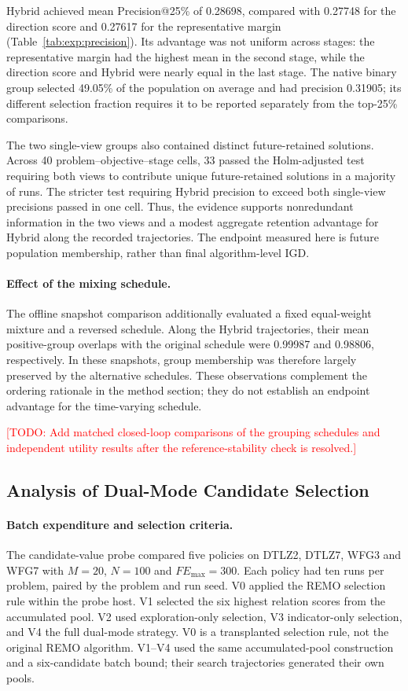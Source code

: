 \documentclass[final,5p,times,twocolumn]{elsarticle}
\newcommand{\TODO}[1]{\textcolor{red}{[TODO: #1]}}
\begin{document}
Hybrid achieved mean Precision@25\% of 0.28698, compared with 0.27748
for the direction score and 0.27617 for the representative margin
(Table~\ref{tab:exp:precision}). Its advantage was not uniform across
stages: the representative margin had the highest mean in the second
stage, while the direction score and Hybrid were nearly equal in the
last stage. The native binary group selected 49.05\% of the population
on average and had precision 0.31905; its different selection fraction
requires it to be reported separately from the top-25\% comparisons.

The two single-view groups also contained distinct future-retained
solutions. Across 40 problem--objective--stage cells, 33 passed the
Holm-adjusted test requiring both views to contribute unique
future-retained solutions in a majority of runs. The stricter test
requiring Hybrid precision to exceed both single-view precisions passed
in one cell. Thus, the evidence supports nonredundant information in the
two views and a modest aggregate retention advantage for Hybrid along
the recorded trajectories. The endpoint measured here is future
population membership, rather than final algorithm-level IGD.

\paragraph{Effect of the mixing schedule.}
The offline snapshot comparison additionally evaluated a fixed
equal-weight mixture and a reversed schedule. Along the Hybrid
trajectories, their mean positive-group overlaps with the original
schedule were 0.99987 and 0.98806, respectively. In these snapshots,
group membership was therefore largely preserved by the alternative
schedules. These observations complement the ordering rationale in the
method section; they do not establish an endpoint advantage for the
time-varying schedule.

\TODO{Add matched closed-loop comparisons of the grouping schedules and
independent utility results after the reference-stability check is resolved.}

\subsection{Analysis of Dual-Mode Candidate Selection}
\label{sec:exp:candidate}

\paragraph{Batch expenditure and selection criteria.}
The candidate-value probe compared five policies on DTLZ2, DTLZ7, WFG3
and WFG7 with $M=20$, $N=100$ and $FE_{\max}=300$. Each policy had ten
runs per problem, paired by the problem and run seed. V0 applied the
REMO selection rule within the probe host. V1 selected the six highest
relation scores from the accumulated pool. V2 used exploration-only
selection, V3 indicator-only selection, and V4 the full dual-mode
strategy. V0 is a transplanted selection rule, not the original REMO
algorithm. V1--V4 used the same accumulated-pool construction and a
six-candidate batch bound; their search trajectories generated their
own pools.
\end{document}
